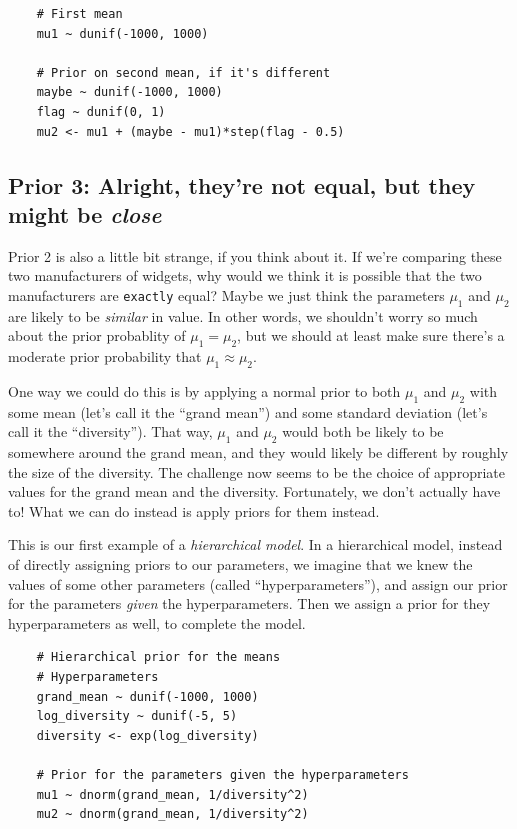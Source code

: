 \begin{framed}
\begin{verbatim}
    # First mean
    mu1 ~ dunif(-1000, 1000)

    # Prior on second mean, if it's different
    maybe ~ dunif(-1000, 1000)
    flag ~ dunif(0, 1)
    mu2 <- mu1 + (maybe - mu1)*step(flag - 0.5)
\end{verbatim}
\end{framed}

\subsection{Prior 3: Alright, they're not equal, but they might be {\it close}}
Prior 2 is also a little bit strange, if you think about it. If we're comparing
these two manufacturers of widgets, why would we think it is possible that the
two manufacturers are {\tt exactly} equal? Maybe we just think the parameters
$\mu_1$ and $\mu_2$ are likely to be {\it similar} in value.
In other words, we shouldn't worry so much about the
prior probablity of $\mu_1 = \mu_2$, but we should at least make sure there's
a moderate prior probability that $\mu_1 \approx \mu_2$.

One way we could do this is by applying a normal prior to both $\mu_1$ and
$\mu_2$ with some mean (let's call it the ``grand mean'')
and some standard deviation (let's call it the ``diversity'').
That way, $\mu_1$ and
$\mu_2$ would both be likely to be somewhere around the grand mean, and
they would likely be different by roughly the size of the diversity.
The challenge now seems to be the choice of appropriate values for the grand
mean and the diversity. Fortunately, we don't actually have to! What we can
do instead is apply priors for them instead.

This is our first example of a {\it hierarchical model}. In a hierarchical
model, instead of directly assigning priors to our parameters, we imagine that
we knew the values of some other parameters (called ``hyperparameters''), and
assign our prior for the parameters {\it given} the hyperparameters. Then we
assign a prior for they hyperparameters as well, to complete the model.

\begin{framed}
\begin{verbatim}
    # Hierarchical prior for the means
    # Hyperparameters
    grand_mean ~ dunif(-1000, 1000)
    log_diversity ~ dunif(-5, 5)
    diversity <- exp(log_diversity)

    # Prior for the parameters given the hyperparameters
    mu1 ~ dnorm(grand_mean, 1/diversity^2)
    mu2 ~ dnorm(grand_mean, 1/diversity^2)
\end{verbatim}
\end{framed}


